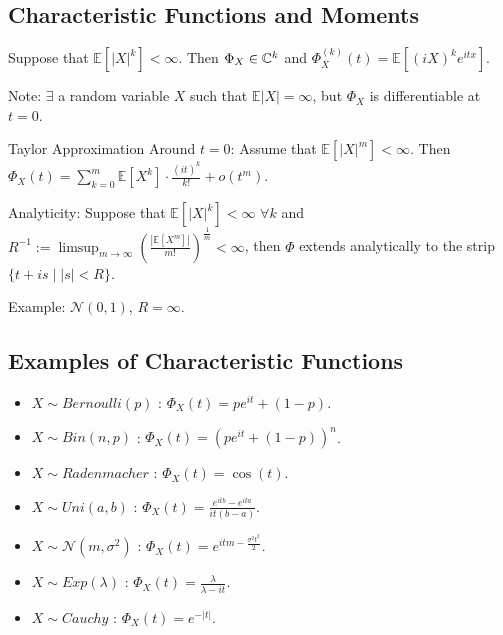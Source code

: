 \documentclass[english, course]{Notes}
\begin{document}
\subsection{Characteristic Functions and Moments}

\begin{theorem}
Suppose that $\mathbb{E}[|X|^k] < \infty$. Then $\Phi_X \in \mathbb{C}^k$ and $\Phi_X^{(k)}(t) = \mathbb{E}[(iX)^k e^{itx}]$.
\end{theorem}

Note: $\exists$ a random variable $X$ such that $\mathbb{E} |X| = \infty$, but $\Phi_X$ is differentiable at $t = 0$.\\

\begin{claim}
Taylor Approximation Around $t=0$: Assume that $\mathbb{E}[|X|^m] < \infty$. Then $\Phi_X(t) = \sum_{k = 0}^m \mathbb{E}[X^k] \cdot \frac{(it)^k}{k!} + o(t^m)$.\\
\end{claim}

\begin{claim}
Analyticity: Suppose that $\mathbb{E}[|X|^k] < \infty$ $\forall k$ and $R^{-1} := \limsup_{m \to \infty}(\frac{|\mathbb{E}[X^m]|}{m!})^\frac{1}{m} < \infty$, then $\Phi$ extends analytically to the strip $\{t + is \mid |s| < R\}$.
\end{claim}

Example: $\mathcal{N}(0, 1)$, $R = \infty$.\\

\subsection{Examples of Characteristic Functions}

\begin{itemize}
	\item $X \sim Bernoulli(p)$ : $\Phi_X(t) = pe^{it} + (1-p)$.
	\item $X \sim Bin(n, p)$ : $\Phi_X(t) = (pe^{it} + (1 - p))^n$.
	\item $X \sim Radenmacher$ : $\Phi_X(t) = \cos(t)$.
	\item $X \sim Uni(a, b)$ : $\Phi_X(t) = \frac{e^{itb} - e^{ita}}{it(b-a)}$.
	\item $X \sim \mathcal{N}(m, \sigma^2)$ : $\Phi_X(t) = e^{itm - \frac{\sigma^2 t^2}{2}}$.
	\item $X \sim Exp(\lambda)$ : $\Phi_X(t) = \frac{\lambda}{\lambda - it}$.
	\item $X \sim Cauchy$ : $\Phi_X(t) = e^{-|t|}$.
\end{itemize}
\end{document}
